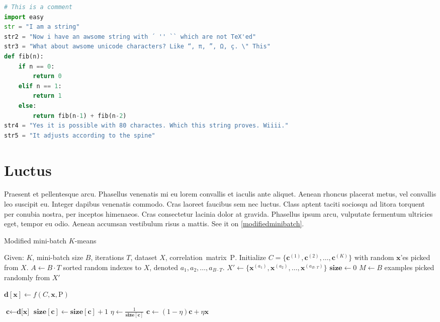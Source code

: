 \begin{adjustwidth*}{0cm}{-0.4cm}
\begin{lstlisting}[language=Python,caption=Fibonacci,label=fibonacci]
# This is a comment
import easy
str = "I am a string"
str2 = "Now i have an awsome string with ´ '' `` which are not TeX'ed"
str3 = "What about awsome unicode characters? Like “, π, ”, Ω, ç. \" This"
def fib(n):
    if n == 0:
        return 0
    elif n == 1:
        return 1
    else:
        return fib(n-1) + fib(n-2)
str4 = "Yes it is possible with 80 charactes. Which this string proves. Wiiii."
str5 = "It adjusts according to the spine"
\end{lstlisting}
\end{adjustwidth*}

\section{Luctus}
Praesent et pellentesque arcu. Phasellus venenatis mi eu lorem convallis et iaculis ante aliquet. Aenean rhoncus placerat metus, vel convallis leo suscipit eu. Integer dapibus venenatis commodo. Cras laoreet faucibus sem nec luctus. Class aptent taciti sociosqu ad litora torquent per conubia nostra, per inceptos himenaeos. Cras consectetur lacinia dolor at gravida. Phasellus ipsum arcu, vulputate fermentum ultricies eget, tempor eu odio. Aenean accumsan vestibulum risus a mattis. See it on \cref{modifiedminibatch}.

\begin{algorithm}
\caption{Modified mini-batch $K$-means} \label{modifiedminibatch}
\begin{algorithmic}[1]
\State Given: $K$, mini-batch size $B$, iterations $T$, dataset $X$, correlation~matrix~$\mathrm{P}$.
\State Initialize $C = \{\mathbf{c}^{(1)}, \mathbf{c}^{(2)}, \ldots, \mathbf{c}^{(K)}\}$ with random $\mathbf{x}$'es picked from $X$.
\State $A \gets B \cdot T$ sorted random indexes to $X$, denoted $a_1, a_2, \ldots, a_{B\cdot T}$.
\State $X' \gets \{\mathbf{x}^{(a_1)}, \mathbf{x}^{(a_2)}, \ldots, \mathbf{x}^{(a_{B\cdot T})}\}$ 
\State $\textbf{size} \gets 0$
    \State $M \gets B$ examples picked randomly from $X'$
    
     
        \State $\textbf{d}[\textbf{x}] \gets f(C,\mathbf{x}, \mathrm{P})$ 
    \EndFor
    
     
        \State $\textbf{c} \gets \textbf{d[x]}$ 
        \State $\textbf{size}[\textbf{c}] \gets \textbf{size}[\textbf{c}] + 1$ 
        \State $\eta \gets \frac{1}{\textbf{size}[\textbf{c}]}$       
        \State $\textbf{c} \gets (1 - \eta)\textbf{c}+\eta\textbf{x}$ 
    \EndFor
\EndFor
\State {}
\end{algorithmic}
\end{algorithm}

